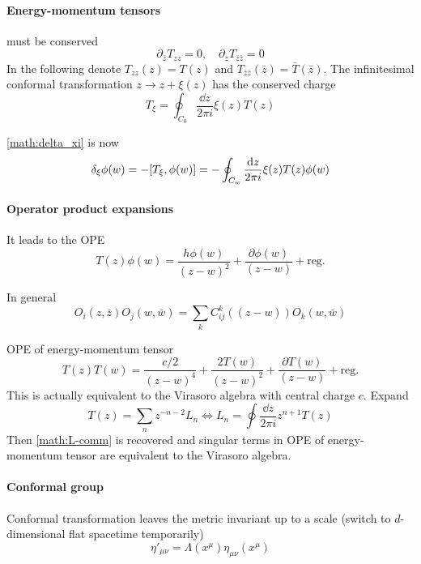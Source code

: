 \documentclass[12pt, a4paper, DIV=15]{article}
\numberwithin{equation}{section}
\begin{document}
\paragraph{Energy-momentum tensors}
must be conserved
\begin{equation}
	\partial_{\bar{z}} T_{zz} = 0, \quad \partial_z T_{\bar{z}\bar{z}} = 0
\end{equation}
In the following denote $T_{zz}(z) = T(z)$ and ${T}_{\bar{z}\bar{z}}(\bar{z}) = \bar{T}(\bar{z})$.
The infinitesimal conformal transformation $z \rightarrow z + \xi(z)$ has the conserved charge
\begin{equation}
	T_\xi = \oint_{C_0} \frac{\dd{z}}{2\pi i } \xi(z) T(z)
\end{equation}

\eqref{math:delta_xi} is now
\begin{equation}
	\delta_\xi \phi(w) = - \comm{T_\xi}{\phi(w)} = - \oint_{C_w} \frac{\dd{z}}{2\pi i} \xi(z) T(z) \phi(w)
\end{equation}

\paragraph{Operator product expansions}
It leads to the OPE
\begin{equation}
	T(z) \phi(w) = \frac{h\phi(w)}{(z-w)^2} + \frac{\partial \phi(w)}{(z-w)} + \text{reg.}
\end{equation}

In general
\begin{equation}
	O_i (z,\bar{z}) O_j (w,\bar{w}) = \sum_k C_{ij}^k((z-w)) O_k(w,\bar{w})
\end{equation}

OPE of energy-momentum tensor 
\begin{equation}
	T(z)T(w) = \frac{c/2}{(z-w)^4} + \frac{2T(w)}{(z-w)^2} + \frac{\partial T(w)}{(z-w)} + \text{reg.}
\end{equation}
This is actually equivalent to the Virasoro algebra with central charge $c$. Expand 
\begin{equation}
	T(z) = \sum_{n} z^{-n-2} L_n \Leftrightarrow L_n = \oint \frac{\dd{z}}{2\pi i} z^{n+1} T(z)
	\label{math:T-conf}
\end{equation}
Then \eqref{math:L-comm} is recovered and singular terms in OPE of energy-momentum tensor are equivalent to the Virasoro algebra.

\paragraph{Conformal group}
Conformal transformation leaves the metric invariant up to a scale (switch to $d$-dimensional flat spacetime temporarily)
\begin{equation}
	\eta'_{\mu\nu} = \Lambda(x^\mu) \eta_{\mu\nu}(x^\mu)	
\end{equation}
\end{document}

